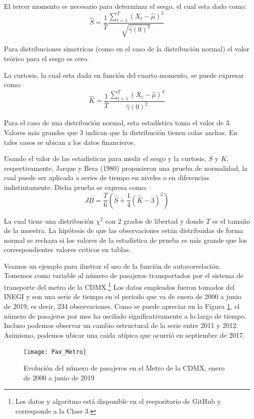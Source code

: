 \documentclass[
  a4paper,
]{article}
\begin{document}
El tercer momento es necesario para determinar el sesgo, el cual esta
dado como: \[
    \hat{S} = \frac{1}{T} \frac{\sum_{t = 1}^{T} (X_t - \hat{\mu})^3}{\sqrt{\hat{\gamma}(0)^3}}
\]

Para distribuciones simetricas (como en el caso de la distribución
normal) el valor teórico para el sesgo es cero.

La curtosis, la cual esta dada en función del cuarto momento, se puede
expresar como: \[
    \hat{K} = \frac{1}{T} \frac{\sum_{t = 1}^{T} (X_t - \hat{\mu})^4}{\hat{\gamma}(0)^2}
\]

Para el caso de una distribución normal, esta estadística toma el valor
de 3. Valores más grandes que 3 indican que la distribución tienen colas
anchas. En tales casos se ubican a los datos financieros.

Usando el valor de las estadísticas para medir el sesgo y la curtosis,
\(S\) y \(K\), respectivamente, Jarque y Bera (1980) propusieron una
prueba de normalidad, la cual puede ser aplicada a series de tiempo en
niveles o en diferencias indistintamente. Dicha prueba se expresa como:
\[
    JB = \frac{T}{6} \left(\hat{S} + \frac{1}{4} (\hat{K} - 3)^2 \right) 
\]

La cual tiene una distribución \(\chi^2\) con \(2\) grados de libertad y
donde \(T\) es el tamaño de la muestra. La hipótesis de que las
observaciones están distribuidas de forma normal se rechaza si los
valores de la estadística de prueba es más grande que los
correspondientes valores criticos en tablas.

Veamos un ejemplo para ilustrar el uso de la función de autocorrelación.
Tomemos como variable al número de pasajeros transportados por el
sistema de transporte del metro de la
CDMX.\footnote{Los datos y algoritmo está disponible en el reepositorio de GitHub y corresponde a la Clase 3.}
Los datos empleados fueron tomados del INEGI y son una serie de tiempo
en el periodo que va de enero de 2000 a junio de 2019, es decir, 234
observaciones. Como se puede apreciar en la Figura \ref{Pax_Metro}, el
número de pasajeros por mes ha oscilado significativamente a lo largo de
tiempo. Incluso podemos observar un cambio estructural de la serie entre
2011 y 2012. Asimismo, podemos ubicar una caida atípica que ocurrió en
septiembre de 2017.

\begin{figure}
  \centering
    \texttt{[image: Pax\_Metro]}
  \caption{Evolución del número de pasajeros en el Metro de la CDMX, enero de 2000 a junio de 2019}
  \label{Pax_Metro}
\end{figure}
\end{document}
